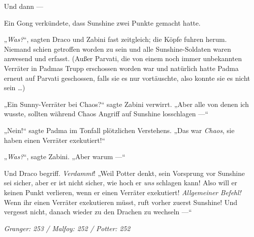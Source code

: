 Und dann —

Ein Gong verkündete, dass Sunshine zwei Punkte gemacht hatte.

„\emph{Was?}“, sagten Draco und Zabini fast zeitgleich; die Köpfe fuhren herum. Niemand schien getroffen worden zu sein und alle Sunshine-Soldaten waren anwesend und erfasst. (Außer Parvati, die von einem noch immer unbekannten Verräter in Padmas Trupp erschossen worden war und natürlich hatte Padma erneut auf Parvati geschossen, falls sie es nur vortäuschte, also konnte sie es nicht sein …)

„Ein Sunny-Verräter bei Chaos?“ sagte Zabini verwirrt.
„Aber alle von denen ich wusste, sollten während Chaos Angriff auf Sunshine losschlagen —“

„Nein!“ sagte Padma im Tonfall plötzlichen Verstehens.
„Das war \emph{Chaos}, sie haben einen Verräter exekutiert!“

„\emph{Was?}“, sagte Zabini.
„Aber warum —“

Und Draco begriff. \emph{Verdammt}!
„Weil Potter denkt, sein Vorsprung vor Sunshine sei sicher, aber er ist nicht sicher, wie hoch er \emph{uns} schlagen kann! Also will er keinen Punkt verlieren, wenn er einen Verräter exekutiert! \emph{Allgemeiner Befehl!} Wenn ihr einen Verräter exekutieren müsst, ruft vorher zuerst Sunshine! Und vergesst nicht, danach wieder zu den Drachen zu wechseln —“

\later

\emph{Granger: 253 / Malfoy: 252 / Potter: 252}

